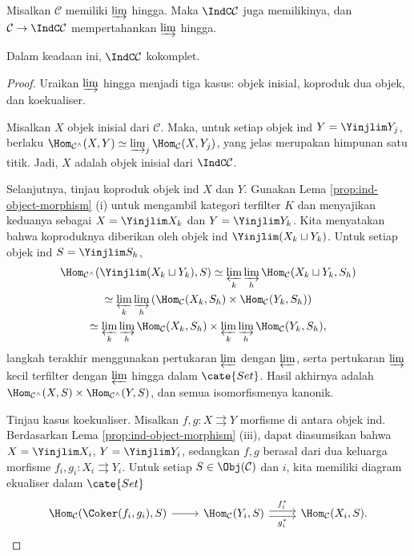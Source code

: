 \begin{lemma}\label{prop:Ind-colim}
	Misalkan $\mathcal{C}$ memiliki $\varinjlim$ hingga. Maka $\IndC\mathcal{C}$ juga memilikinya, dan $\mathcal{C} \to \IndC\mathcal{C}$ mempertahankan $\varinjlim$ hingga.
	
	Dalam keadaan ini, $\IndC\mathcal{C}$ kokomplet.
\end{lemma}
\begin{proof}
	Uraikan $\varinjlim$ hingga menjadi tiga kasus: objek inisial, koproduk dua objek, dan koekualiser.
	
	Misalkan $X$ objek inisial dari $\mathcal{C}$. Maka, untuk setiap objek ind $Y = \Yinjlim Y_j$, berlaku $\Hom_{\mathcal{C}^\wedge}(X, Y) \simeq \varinjlim_j \Hom_{\mathcal{C}}(X, Y_j)$, yang jelas merupakan himpunan satu titik. Jadi, $X$ adalah objek inisial dari $\IndC\mathcal{C}$.
	
	Selanjutnya, tinjau koproduk objek ind $X$ dan $Y$. Gunakan Lema \ref{prop:ind-object-morphism} (i) untuk mengambil kategori terfilter $K$ dan menyajikan keduanya sebagai $X = \Yinjlim X_k$ dan $Y = \Yinjlim Y_k$. Kita menyatakan bahwa koproduknya diberikan oleh objek ind $\Yinjlim (X_k \sqcup Y_k)$. Untuk setiap objek ind $S = \Yinjlim S_h$,
	\begin{multline*}
		\Hom_{\mathcal{C}^\wedge}(\Yinjlim (X_k \sqcup Y_k), S) \simeq \varprojlim_k \varinjlim_h \Hom_{\mathcal{C}}(X_k \sqcup Y_k, S_h) \\
		\simeq \varprojlim_k \varinjlim_h \left( \Hom_{\mathcal{C}}(X_k, S_h) \times \Hom_{\mathcal{C}}(Y_k, S_h) \right) \\
		\simeq \varprojlim_k \varinjlim_h \Hom_{\mathcal{C}}(X_k, S_h) \times \varprojlim_k \varinjlim_h \Hom_{\mathcal{C}}(Y_k, S_h),
	\end{multline*}
	langkah terakhir menggunakan pertukaran $\varprojlim$ dengan $\varprojlim$, serta pertukaran $\varinjlim$ kecil terfilter dengan $\varprojlim$ hingga dalam $\cate{Set}$. Hasil akhirnya adalah $\Hom_{\mathcal{C}^\wedge}(X, S) \times \Hom_{\mathcal{C}^\wedge}(Y, S)$, dan semua isomorfismenya kanonik.
	
	Tinjau kasus koekualiser. Misalkan $f, g: X \rightrightarrows Y$ morfisme di antara objek ind. Berdasarkan Lema \ref{prop:ind-object-morphism} (iii), dapat diasumsikan bahwa $X = \Yinjlim X_i$, $Y = \Yinjlim Y_i$, sedangkan $f, g$ berasal dari dua keluarga morfisme $f_i, g_i: X_i \rightrightarrows Y_i$. Untuk setiap $S \in \Obj(\mathcal{C})$ dan $i$, kita memiliki diagram ekualiser dalam $\cate{Set}$
	\[\begin{tikzcd}
		\Hom_{\mathcal{C}}(\Coker(f_i, g_i), S) \arrow[r] &
		\Hom_{\mathcal{C}}(Y_i, S) \arrow[r, shift left, "{f_i^*}"] \arrow[r, shift right, "{g_i^*}"'] & \Hom_{\mathcal{C}}(X_i, S).
	\end{tikzcd}\]
	

\end{proof}
